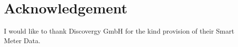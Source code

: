\section*{Acknowledgement}

I would like to thank Discovergy GmbH for the kind provision of their Smart Meter Data.
